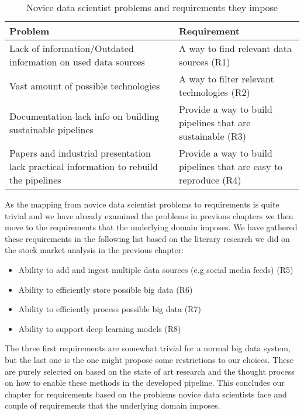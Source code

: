 \begin{table}[! htbp]\centering 
  \caption{Novice data scientist problems and requirements they impose}
  \begin{threeparttable}
      \begin{tabular}{|p{6cm}|p{6cm}|}
      \hline
      Problem & Requirement \\ \hline
      Lack of information/Outdated information on used data sources &  A way to find relevant data sources (R1)\\ \hline
      Vast amount of possible technologies &  A way to filter relevant technologies (R2)\\ \hline
      Documentation lack info on building sustainable pipelines & Provide a way to build pipelines that are sustainable (R3) \\ \hline
      Papers and industrial presentation lack practical information to rebuild the pipelines & Provide a way to build pipelines that are easy to reproduce (R4)\\ \hline
      \end{tabular}
  \end{threeparttable}
\end{table}

As the mapping from novice data scientist problems to requirements is quite trivial and we have already examined the problems in previous chapters we then move to the requirements that the underlying domain imposes.
We have gathered these requirements in the following list based on the literary research we did on the stock market analysis in the previous chapter:

\begin{itemize}
  \item Ability to add and ingest multiple data sources (e.g social media feeds) (R5)
  \item Ability to efficiently store possible big data (R6)
  \item Ability to efficiently process possible big data (R7)
  \item Ability to support deep learning models (R8)
\end{itemize}

The three first requirements are somewhat trivial for a normal big data system, but the last one is the one might propose some restrictions to our choices.
These are purely selected on based on the state of art research and the thought process on how to enable these methods in the developed pipeline.
This concludes our chapter for requirements based on the problems novice data scientists face and couple of requirements that the underlying domain imposes.
